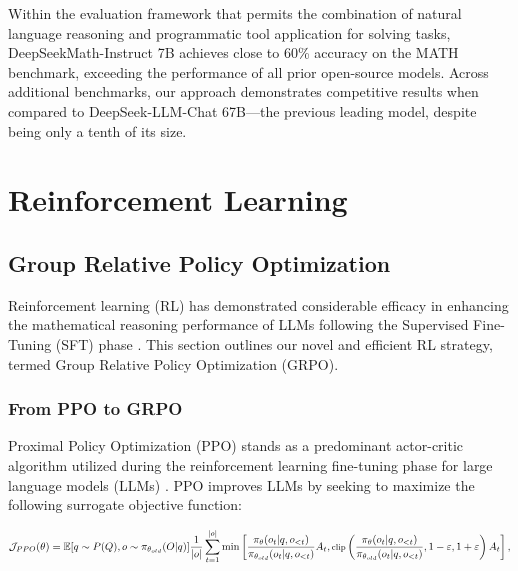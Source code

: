 \begin{itemize}[topsep=0pt]
Within the evaluation framework that permits the combination of natural language reasoning and programmatic tool application for solving tasks, DeepSeekMath-Instruct 7B achieves close to 60\% accuracy on the MATH benchmark, exceeding the performance of all prior open-source models. Across additional benchmarks, our approach demonstrates competitive results when compared to DeepSeek-LLM-Chat 67B—the previous leading model, despite being only a tenth of its size.

\section{Reinforcement Learning}

\subsection{Group Relative Policy Optimization} Reinforcement learning (RL) has demonstrated considerable efficacy in enhancing the mathematical reasoning performance of LLMs following the Supervised Fine-Tuning (SFT) phase \citep{wang2023math,wizardmath}. This section outlines our novel and efficient RL strategy, termed Group Relative Policy Optimization (GRPO).

\subsubsection{From PPO to GRPO} Proximal Policy Optimization (PPO) \citep{schulman2017proximal} stands as a predominant actor-critic algorithm utilized during the reinforcement learning fine-tuning phase for large language models (LLMs) \citep{ouyang2022training}. PPO improves LLMs by seeking to maximize the following surrogate objective function:

\begin{equation}
\footnotesize
    \mathcal{J}_{PPO}(\theta) = \mathbb{E}{[q \sim P(Q), o \sim \pi_{\theta_{old}}(O|q)]} \frac{1}{|o|} \sum_{t=1}^{|o|} \min \left[ \frac{\pi_\theta(o_{t} | q, o_{<t})}{\pi_{\theta_{old}}(o_{t} | q, o_{<t})} A_{t}, \text{clip} \left( \frac{\pi_\theta(o_{t} | q, o_{<t})}{\pi_{\theta_{old}}(o_{t} | q, o_{<t})}, 1 - \varepsilon, 1 + \varepsilon \right)  A_{t} \right] ,
\end{equation}


\end{itemize}
